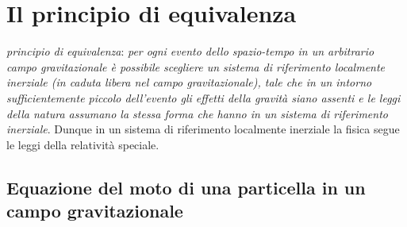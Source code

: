 \cleardoublepage
\chapter{Il principio di equivalenza}
\label{cha:principio-equivalenza}


\emph{principio di equivalenza}:
\emph{per ogni evento dello spazio-tempo in un arbitrario campo gravitazionale è
  possibile scegliere un sistema di riferimento \emph{localmente inerziale} (in
  caduta libera nel campo gravitazionale), tale che in un intorno
  sufficientemente piccolo dell'evento gli effetti della gravità siano assenti e
  le leggi della natura assumano la stessa forma che hanno in un sistema di
  riferimento inerziale}.
Dunque in un sistema di riferimento localmente inerziale la fisica segue le
leggi della relatività speciale.

\section{Equazione del moto di una particella in un campo gravitazionale}
\label{sec:equazione-moto}

